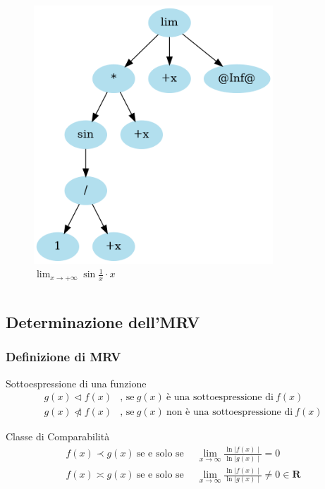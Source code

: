 \documentclass[aspectratio=149]{beamer}
\begin{document}
\begin{frame}
\begin{columns}
\begin{column}{0.45\textwidth}
\begin{figure}
					\includegraphics[width=0.8\textwidth]{pres_img/prima_semplif.png}
					\caption{\(\lim_{x \to +\infty}{\sin{\frac{1}{x}} \cdot x}\)}
				\end{figure}
			\end{column}
		\end{columns}
	\end{frame}

	\subsection{Determinazione dell'MRV}
	
	\begin{frame}
		\frametitle{Definizione di MRV}
		\begin{block}{Sottoespressione di una funzione}
			\[
			\begin{aligned}
				g(x) \triangleleft f(x)&\text{, se} \: g(x) \: \text{è una sottoespressione di} \: f(x) \\
				g(x) \ntriangleleft f(x)&\text{, se} \: g(x) \: \text{non è una sottoespressione di} \: f(x)
			\end{aligned}
			\]
		\end{block}
		\begin{block}{Classe di Comparabilità}
			\[
			\begin{aligned}
				f(x) \prec g(x) \: \text{se e solo se} \enspace &\lim_{x \to \infty}{\frac{\ln{\mid f(x)\mid}}{\ln{\mid g(x)\mid}}} = 0 \\ 
				f(x) \asymp g(x) \: \text{se e solo se} \enspace &\lim_{x \to \infty}{\frac{\ln{\mid f(x)\mid}}{\ln{\mid g(x)\mid}}} \neq 0 \in \mathbf{R}
			\end{aligned}
			\] 
		\end{block}
	\end{frame}
\end{document}

